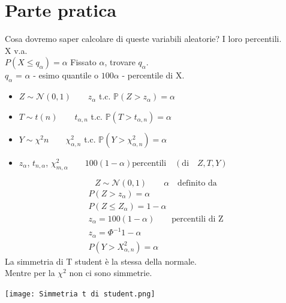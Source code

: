 \documentclass[12pt, a4paper, openany]{book}
\begin{document}
\section{Parte pratica}
Cosa dovremo saper calcolare di queste variabili aleatorie? I loro percentili.
\\ X v.a.
\\ $P(X\leq q_\alpha) = \alpha$ Fissato $\alpha$, trovare $q_\alpha$.
\\ $q_\alpha$ = $\alpha$ - esimo quantile o $100\alpha$ - percentile di X.
\begin{itemize}
    \item $Z \sim \mathcal{N}(0,1) \qquad z_\alpha$ t.c. $\mathbb{P}(Z>z_\alpha) = \alpha$
    \item $T \sim t(n) \qquad t_{\alpha, n}$ t.c. $\mathbb{P}(T>t_{\alpha, n}) = \alpha$
    \item $Y \sim \chi^2{n} \qquad \chi^2_{\alpha, n}$ t.c. $\mathbb{P}(Y>\chi^2_{\alpha,n}) = \alpha$
    \item $z_\alpha$, $t_{n, \alpha}$, $\chi^2_{m, \alpha} 
    \qquad 100(1-\alpha) \text{percentili} \quad (\text{di}\quad Z, T, Y)$
\end{itemize}
\begin{equation*}
    Z \sim \mathcal{N}(0,1) \qquad \alpha \quad \text{definito da}
\end{equation*}
\begin{gather*}
    P(Z>z_\alpha) = \alpha \\
    P(Z\leq Z_\alpha) = 1-\alpha \\
    z_\alpha = 100(1-\alpha) \qquad \text{percentili di Z}\\
    z_\alpha = \Phi^{-1}{1-\alpha} \\
    P(Y > X^2_{\alpha, n}) = \alpha
\end{gather*}
La simmetria di T student è la stessa della normale.
\\ Mentre per la $\chi^2$ non ci sono simmetrie.
\begin{center}
    \texttt{[image: Simmetria t di student.png]}
\end{center}
\end{document}
